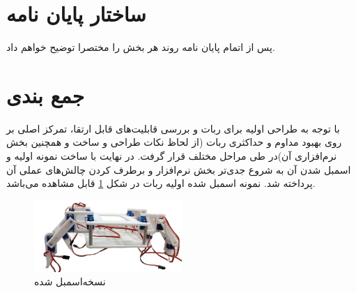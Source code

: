 
\section{ساختار پایان نامه}

پس از اتمام پایان نامه روند هر بخش را مختصرا توضیح خواهم داد.

\section{جمع بندی}

با توجه به طراحی اولیه برای ربات و بررسی قابلیت‌های قابل ارتقا، تمرکز اصلی بر روی بهبود مداوم و حداکثری ربات (از لحاظ نکات طراحی و ساخت و همچنین بخش نرم‌افزاری آن)در طی مراحل مختلف قرار گرفت. در نهایت با ساخت نمونه اولیه و اسمبل
\noindent\unskip{}
شدن آن به شروع جدی‌تر بخش نرم‌افزار و برطرف کردن چالش‌های عملی آن پرداخته شد.
نمونه اسمبل شده اولیه ربات در شکل
\ref{نسخه‌اسمبل شده}
قابل مشاهده می‌باشد.

\begin{figure}[H]
	\centering
	\includegraphics[width=0.5\textwidth]{./images/Chapter1/Assembled_Robot_without_background}	
	\caption[نسخه‌اسمبل شده]{نسخه‌اسمبل شده}
	\label{نسخه‌اسمبل شده}
\end{figure}
\noindent
\unskip

